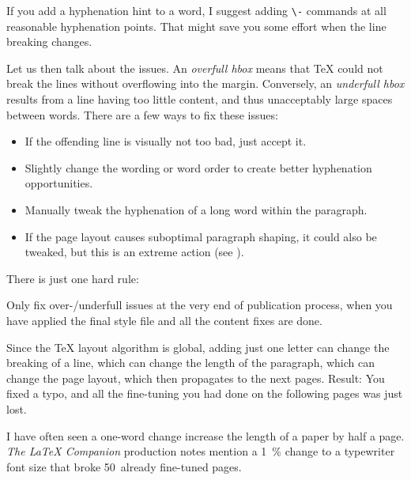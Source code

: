 \begin{practices}
If you add a hyphenation hint to a word,
I suggest adding \verb|\-| commands at all reasonable hyphenation points.
That might save you some effort when the line breaking changes.
\end{practices}


Let us then talk about the issues.
An \emph{overfull hbox} means that \TeX{} could not break the lines
without overflowing into the margin.
Conversely, an \emph{underfull hbox} results from a line having too little content,
and thus unacceptably large spaces between words.
There are a few ways to fix these issues:

\begin{itemize}
    \item If the offending line is visually not too bad, just accept it.
    \item Slightly change the wording or word order to create better hyphenation opportunities.
    \item Manually tweak the hyphenation of a long word within the paragraph.
    \item If the page layout causes suboptimal paragraph shaping,
        it could also be tweaked, but this is an extreme action (see ).
\end{itemize}
%
There is just one hard rule:

\begin{warning}
Only fix over-/underfull issues at the very end of publication process,
when you have applied the final style file
and all the content fixes are done.

Since the \TeX{} layout algorithm is global,
adding just one letter can change the breaking of a line,
which can change the length of the paragraph,
which can change the page layout,
which then propagates to the next pages.
Result: You fixed a typo, and all the fine-tuning you had done on the following pages was just lost.

I have often seen a one-word change increase the length of a paper by half a page.
\emph{The \LaTeX{} Companion} \cite{TLC} production notes mention
a 1~\% change to a typewriter font size that broke 50~already fine-tuned pages.
\end{warning}

